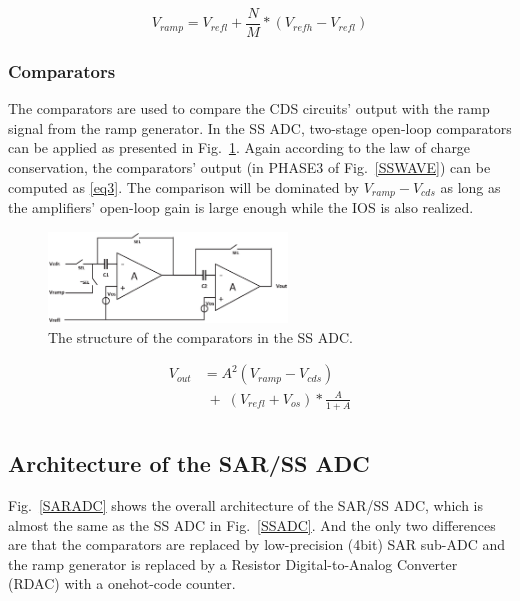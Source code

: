 \begin{equation}
	V_{ramp}=V_{refl}+\frac{N}{M}\ast\left(V_{refh}-V_{refl}\right)
	\label{eq2}
\end{equation}

\subsubsection{Comparators}

The comparators are used to compare the CDS circuits' output with the ramp signal from the ramp generator. 
In the SS ADC, two-stage open-loop comparators can be applied as presented in Fig.~\ref{COM}. Again according to the law of charge conservation, 
the comparators’ output (in PHASE3 of Fig.~\ref{SSWAVE}) can be computed as \eqref{eq3}. The comparison will be dominated by $V_{ramp}-V_{cds}$ as long as the amplifiers’ open-loop gain 
is large enough while the IOS is also realized.%

\begin{figure}[htbp]
	\centerline{\includegraphics[width=2.5in]{./Figures/COM.eps}}
	\caption{The structure of the comparators in the SS ADC.}
	\label{COM}
\end{figure} 

\begin{equation}
	\begin{aligned}
		V_{out}&=A^2(V_{ramp}-V_{cds})\\
		&\;{+}\;\left(V_{refl}+V_{os}\right)\ast\frac{A}{1+A}\\ 		
		\label{eq3}
	\end{aligned}
\end{equation}

\subsection{Architecture of the SAR/SS ADC}

Fig.~\ref{SARADC} shows the overall architecture of the SAR/SS ADC, which is almost the same as the SS ADC in Fig.~\ref{SSADC}. And the only two differences are that the comparators are replaced by low-precision (4bit) SAR sub-ADC and
the ramp generator is replaced by a Resistor Digital-to-Analog Converter (RDAC) with a onehot-code counter.

